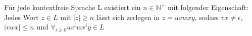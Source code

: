 \documentclass[14pt]{article}
\begin{document}
\begin{definition}
    Für jede kontextfreie Sprache L existiert ein $n \in \mathbb{N}^+$ mit folgender
    Eigenschaft: \\
    Jedes Wort $z \in L$ mit $|z| \geq n$ lässt sich zerlegen in $z = uvwxy$, sodass
    $vx \neq \epsilon$, $|vwx| \leq n$ und $\forall_{i \geq 0} uv^iwx^iy \in L$
\end{definition}
\end{document}
